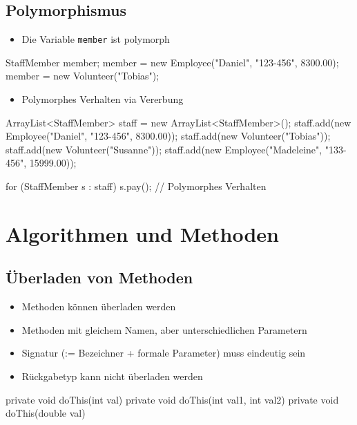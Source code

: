 \documentclass[a4paper,10pt, dvipsnames]{report}
\newcommand{\javaInLine}[1]{\texttt{#1}}
\begin{document}
\subsection{Polymorphismus}


\begin{itemize}
	\item Die Variable \javaInLine{member} ist polymorph
\end{itemize}

\begin{javacodebox}
StaffMember member;
member = new Employee("Daniel", "123-456", 8300.00);
member = new Volunteer("Tobias");
\end{javacodebox}

\begin{itemize}
	\item Polymorphes Verhalten via Vererbung
\end{itemize}

\begin{javacodebox}
ArrayList<StaffMember> staff = new ArrayList<StaffMember>();
staff.add(new Employee("Daniel", "123-456", 8300.00));
staff.add(new Volunteer("Tobias"));
staff.add(new Volunteer("Susanne"));
staff.add(new Employee("Madeleine", "133-456", 15999.00));

for (StaffMember s : staff)
    s.pay(); // Polymorphes Verhalten
\end{javacodebox}


\section{Algorithmen und Methoden}

\subsection{Überladen von Methoden}

\begin{itemize}
    \item Methoden können überladen werden
    \item Methoden mit gleichem Namen, aber unterschiedlichen Parametern
    \item Signatur (:= Bezeichner + formale Parameter) muss eindeutig sein
    \item Rückgabetyp kann nicht überladen werden
\end{itemize}

\begin{javacodebox}
private void doThis(int val) {
}
private void doThis(int val1, int val2) {
}
private void doThis(double val) {
}
\end{javacodebox}
\end{document}
